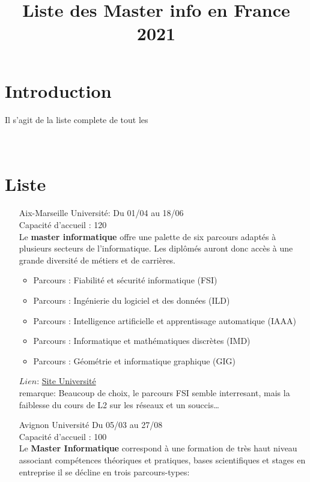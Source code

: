 \documentclass[a4paper,11pt]{article}
\title{\color{OrangeHaf} \Huge Liste des Master info en France\\2021}
\date{}
\newcommand{\e}{\'{e}}
\begin{document}
\pagecolor{BlackHaf}
    \maketitle
    \section{Introduction}
        Il s'agit de la liste complete de tout les
        \\
        \\
        \\
    \section{Liste}
    \begin{enumerate}
        \item [\color{LightOrangeHaf} Aix-Marseille Université:] Du 01/04 au 18/06 
                \\Capacité d'accueil : 120
                \\ Le \textbf{master informatique} offre une palette de six parcours adaptés à plusieurs secteurs de l'informatique. Les diplômés auront donc accès à une grande diversité de métiers et de carrières.
                \begin{itemize}
                    \item Parcours : Fiabilité et sécurité informatique (FSI)
                    \item Parcours : Ingénierie du logiciel et des données (ILD)
                    \item Parcours : Intelligence artificielle et apprentissage automatique (IAAA)
                    \item Parcours : Informatique et mathématiques discrètes (IMD)
                    \item Parcours : Géométrie et informatique graphique (GIG)
                \end{itemize}
                $Lien$: \href{https://informatique-sciences.univ-amu.fr/master-informatique}{Site Université}\\
                remarque: Beaucoup de choix, le parcours FSI semble interresant, mais la faiblesse du cours de L2 sur les r\e seaux et un souccis\dots
\\
        \item [\color{LightOrangeHaf} Avignon Université] Du 05/03 au 27/08 
                \\Capacité d'accueil : 100
                \\Le \textbf{Master Informatique }correspond à une formation de très haut niveau associant compétences théoriques et pratiques, bases scientifiques et stages en entreprise il se décline en trois parcours-types:

\end{enumerate}
\end{document}
